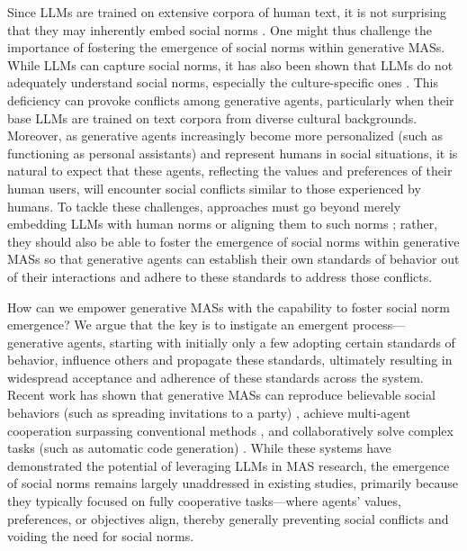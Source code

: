\documentclass{article}
\begin{document}
Since LLMs are trained on extensive corpora of human text, 
it is not surprising that they may inherently embed social norms \cite{schramowski2022large,guo2023data}. 
One might thus challenge the importance of fostering the emergence of social norms within generative MASs.
While LLMs can capture social norms, it has also been shown that LLMs do not adequately understand social norms, especially the culture-specific ones \cite{ramezani2023knowledge,hammerl2022multilingual}. This deficiency can provoke conflicts among generative agents, particularly when their base LLMs are trained on text corpora from diverse cultural backgrounds.
Moreover, as generative agents increasingly become more personalized (such as functioning as personal assistants) and represent humans in social situations, it is natural to expect that these agents, reflecting the values and preferences of their human users, will encounter social conflicts similar to those experienced by humans.
To tackle these challenges,
approaches must go beyond merely embedding LLMs with human norms or aligning them to such norms \cite{liu2024training,li2024agent}; rather, they should also be able to foster the emergence of social norms within generative MASs so that generative agents can establish their own standards of behavior out of their interactions and adhere to these standards to address those conflicts.



How can we empower generative MASs with the capability to foster social norm emergence? 
We argue that the key is to instigate an emergent process---generative agents, starting with initially only a few adopting certain standards of behavior, influence others and propagate these standards, ultimately resulting in widespread acceptance and adherence of these standards across the system.
Recent work has shown that generative MASs can reproduce believable social behaviors (such as spreading invitations to a party) \cite{Park2023GenerativeAgents}, achieve multi-agent cooperation surpassing conventional methods \cite{zhang2024building}, and collaboratively solve complex tasks (such as automatic code generation) \cite{hong2023metagpt}.
While these systems have demonstrated the potential of leveraging LLMs in MAS research, the emergence of social norms remains largely unaddressed in existing studies, primarily because they typically focused on fully cooperative tasks---where agents' values, preferences, or objectives align, thereby generally preventing social conflicts and voiding the need for social norms. 
\end{document}
